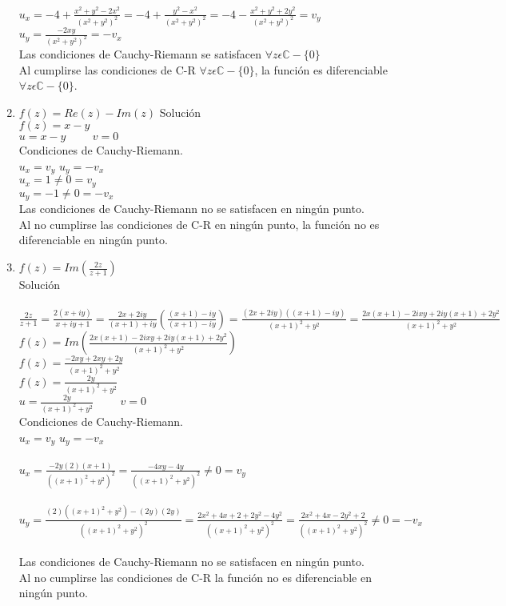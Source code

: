 \documentclass[12pt,letterpaper]{article}
\begin{document}
\begin{enumerate}
$u_x =-4+\frac{x^2+y^2-2x^2}{(x^2+y^2)^2}= -4+\frac{y^2-x^2}{(x^2+y^2)^2}= -4-\frac{x^2+y^2+2y^2}{(x^2+y^2)^2} = v_y$\\
$u_y = \frac{-2xy}{(x^2+y^2)^2}=-v_x$\\
Las condiciones de Cauchy-Riemann se satisfacen $\forall z \epsilon \mathbb{C}-\{0\}$\\
Al cumplirse las condiciones de C-R $\forall z \epsilon \mathbb{C}-\{0\}$, la funci\'on es diferenciable $\forall z \epsilon \mathbb{C}-\{0\}$.
\item $f(z)= Re(z)-Im(z)$
Soluci\'on\\
$f(z)= x-y$\\
$u=x-y \hspace{1cm} v=0$\\
Condiciones de Cauchy-Riemann.\\
$u_x=v_y$ \hspace{1cm} $u_y=-v_x$\\
$u_x = 1 \neq 0 = v_y$\\
$u_y = -1\neq 0 =-v_x$\\
Las condiciones de Cauchy-Riemann no se satisfacen en ning\'un punto.\\
Al no cumplirse las condiciones de C-R en ning\'un punto, la funci\'on no es diferenciable en ning\'un punto.
\item $f(z)= Im(\frac{2z}{z+1})$ \\
Soluci\'on\\ \\
$\frac{2z}{z+1} = \frac{2(x+iy)}{x+iy+1} = \frac{2x+2iy}{(x+1)+iy} (\frac{(x+1)-iy}{(x+1)-iy})= \frac{(2x+2iy)((x+1)-iy)}{(x+1)^2+y^2} = \frac{2x(x+1)-2ixy+2iy(x+1)+2y^2}{(x+1)^2+y^2}$\\
$f(z)= Im(\frac{2x(x+1)-2ixy+2iy(x+1)+2y^2}{(x+1)^2+y^2})$\\
$f(z)= \frac{-2xy+2xy+2y}{(x+1)^2+y^2}$\\
$f(z)= \frac{2y}{(x+1)^2+y^2}$\\
$u=\frac{2y}{(x+1)^2+y^2} \hspace{1cm} v=0$\\
Condiciones de Cauchy-Riemann.\\
$u_x=v_y$ \hspace{1cm} $u_y=-v_x$\\ \\
$u_x=\frac{-2y(2)(x+1)}{((x+1)^2+y^2)^2} = \frac{-4xy-4y}{((x+1)^2+y^2)^2} \neq 0 = v_y$\\ \\
$u_y = \frac{(2)((x+1)^2+y^2)-(2y)(2y)}{((x+1)^2+y^2)^2} = \frac{2x^2+4x+2+2y^2-4y^2}{((x+1)^2+y^2)^2} = \frac{2x^2+4x-2y^2+2}{((x+1)^2+y^2)^2} \neq 0 =-v_x$\\ \\
Las condiciones de Cauchy-Riemann no se satisfacen en ning\'un punto.\\
Al no cumplirse las condiciones de C-R la funci\'on no es diferenciable en ning\'un punto.
\end{enumerate}
\end{document}
